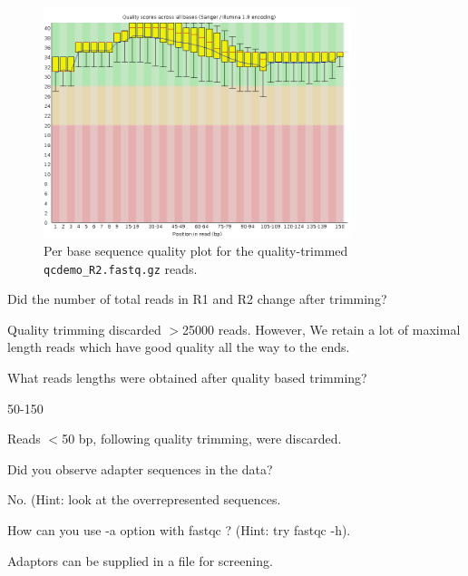 \begin{steps}
\begin{figure}[H]
\centering
\includegraphics[width=0.8\textwidth]{handout/bad_qcdemo_R2_quality_trimmed.png}
\caption{Per base sequence quality plot for the quality-trimmed \texttt{qcdemo\_R2.fastq.gz} reads.}
\label{fig:bad_example_quality_trimmed_plot}
\end{figure}

\end{steps}

\begin{questions}

Did the number of total reads in R1 and R2 change after trimming?
\begin{answer}
Quality trimming discarded $>$25000 reads. However, We retain a lot of maximal
length reads which have good quality all the way to the ends.
\end{answer}

What reads lengths were obtained after quality based trimming?
\begin{answer}
50-150

Reads $<$50 bp, following quality trimming, were discarded.
\end{answer}

Did you observe adapter sequences in the data?
\begin{answer}
No. (Hint: look at the overrepresented sequences.
\end{answer}

How can you use -a option with fastqc ? (Hint: try fastqc -h).
\begin{answer}
Adaptors can be supplied in a file for screening.
\end{answer}
\end{questions}

